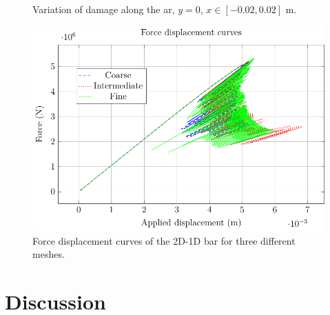 \documentclass[10pt]{elsarticle}
\begin{document}
\begin{figure}[ht]
	\centering
	
	\caption{Variation of damage along the ar, $y=0$, $x \in [-0.02,0.02]$ \unit{\meter}.}
	\label{L_comparison_y}
\end{figure}


\begin{figure}[ht]
	\centering
	\includegraphics{./Images/L/force_displacement.pdf}
	\caption{Force displacement curves of the 2D-1D bar for three different meshes.}
	\label{L_force_displacement}
\end{figure}

\section{Discussion}
\end{document}
